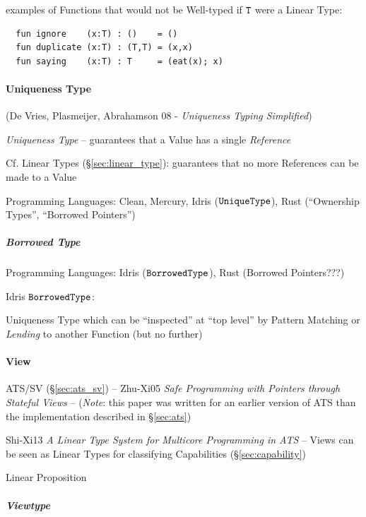 examples of Functions that would not be Well-typed if $\mathtt{T}$ were
a Linear Type:
\begin{verbatim}
  fun ignore    (x:T) : ()    = ()
  fun duplicate (x:T) : (T,T) = (x,x)
  fun saying    (x:T) : T     = (eat(x); x)
\end{verbatim}



\paragraph{Uniqueness Type}\label{sec:uniqueness_type}\hfill

(De Vries, Plasmeijer, Abrahamson 08 - \emph{Uniqueness Typing
  Simplified})

\emph{Uniqueness Type} -- guarantees that a Value has a single
\emph{Reference}

\fist Cf. Linear Types (\S\ref{sec:linear_type}): guarantees that no
more References can be made to a Value

Programming Languages: Clean, Mercury, Idris ($\mathtt{UniqueType}$), Rust
(``Ownership Types'', ``Borrowed Pointers'')



\subparagraph{Borrowed Type}\label{sec:borrowed_type}\hfill

Programming Languages: Idris ($\mathtt{BorrowedType}$), Rust (Borrowed
Pointers???)

Idris $\mathtt{BorrowedType}$:

Uniqueness Type which can be ``inspected'' at ``top level'' by Pattern
Matching or \emph{Lending} to another Function (but no further)



\paragraph{View}\label{sec:view}\hfill

ATS/SV (\S\ref{sec:ats_sv}) -- Zhu-Xi05 \emph{Safe Programming with
  Pointers through Stateful Views} -- (\emph{Note}: this paper was
written for an earlier version of ATS than the implementation
described in \S\ref{sec:ats})

Shi-Xi13 \emph{A Linear Type System for Multicore Programming in ATS}
-- Views can be seen as Linear Types for classifying Capabilities
(\S\ref{sec:capability})

Linear Proposition



\subparagraph{Viewtype}\label{sec:viewtype}\hfill

